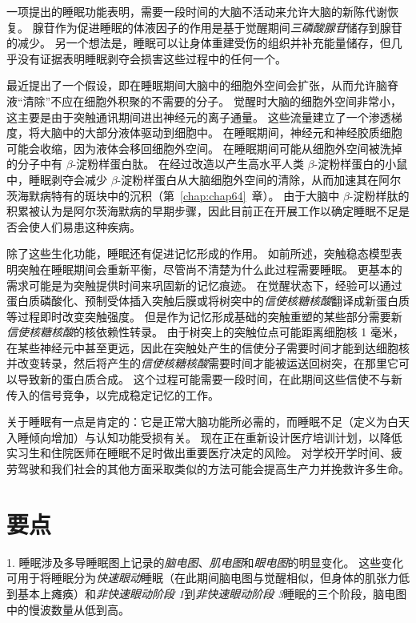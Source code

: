 一项提出的睡眠功能表明，需要一段时间的大脑不活动来允许大脑的新陈代谢恢复。
腺苷作为促进睡眠的体液因子的作用是基于觉醒期间\textit{三磷酸腺苷}储存到腺苷的减少。
另一个想法是，睡眠可以让身体重建受伤的组织并补充能量储存，但几乎没有证据表明睡眠剥夺会损害这些过程中的任何一个。


最近提出了一个假设，即在睡眠期间大脑中的细胞外空间会扩张，从而允许脑脊液“清除”不应在细胞外积聚的不需要的分子。
觉醒时大脑的细胞外空间非常小，这主要是由于突触通讯期间进出神经元的离子通量。
这些流量建立了一个渗透梯度，将大脑中的大部分液体驱动到细胞中。
在睡眠期间，神经元和神经胶质细胞可能会收缩，因为液体会移回细胞外空间。
在睡眠期间可能从细胞外空间被洗掉的分子中有 $ \beta $-淀粉样蛋白肽。
在经过改造以产生高水平人类 $ \beta $-淀粉样蛋白的小鼠中，睡眠剥夺会减少 $ \beta $-淀粉样蛋白从大脑细胞外空间的清除，从而加速其在阿尔茨海默病特有的斑块中的沉积（第~\ref{chap:chap64}~章）。
由于大脑中 $ \beta $-淀粉样肽的积累被认为是阿尔茨海默病的早期步骤，因此目前正在开展工作以确定睡眠不足是否会使人们易患这种疾病。


除了这些生化功能，睡眠还有促进记忆形成的作用。
如前所述，突触稳态模型表明突触在睡眠期间会重新平衡，尽管尚不清楚为什么此过程需要睡眠。
更基本的需求可能是为突触提供时间来巩固新的记忆痕迹。
在觉醒状态下，经验可以通过蛋白质磷酸化、预制受体插入突触后膜或将树突中的\textit{信使核糖核酸}翻译成新蛋白质等过程即时改变突触强度。
但是作为记忆形成基础的突触重塑的某些部分需要新\textit{信使核糖核酸}的核依赖性转录。
由于树突上的突触位点可能距离细胞核 1 毫米，在某些神经元中甚至更远，因此在突触处产生的信使分子需要时间才能到达细胞核并改变转录，然后将产生的\textit{信使核糖核酸}需要时间才能被运送回树突，在那里它可以导致新的蛋白质合成。
这个过程可能需要一段时间，在此期间这些信使不与新传入的信号竞争，以完成稳定记忆的工作。


关于睡眠有一点是肯定的：它是正常大脑功能所必需的，而睡眠不足（定义为白天入睡倾向增加）与认知功能受损有关。
现在正在重新设计医疗培训计划，以降低实习生和住院医师在睡眠不足时做出重要医疗决定的风险。
对学校开学时间、疲劳驾驶和我们社会的其他方面采取类似的方法可能会提高生产力并挽救许多生命。



\section{要点}

1. 睡眠涉及多导睡眠图上记录的\textit{脑电图}、\textit{肌电图}和\textit{眼电图}的明显变化。
这些变化可用于将睡眠分为\textit{快速眼动}睡眠（在此期间脑电图与觉醒相似，但身体的肌张力低到基本上瘫痪）和\textit{非快速眼动阶段 1}到\textit{非快速眼动阶段 3}睡眠的三个阶段，脑电图中的慢波数量从低到高。



